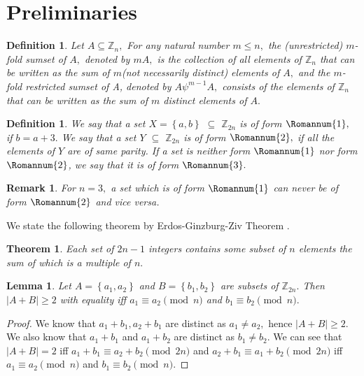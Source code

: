 \documentclass[reqno,10pt]{amsart}
\newtheorem{definition}[prop]{Definition}
\newtheorem{lem}[prop]{ Lemma}
\newtheorem{thm}[prop]{Theorem}
\newtheorem{remar}[prop]{Remark}
\newcommand{\one}{ \Romannum {1}}
\newcommand{\two}{\Romannum {2}}
\begin{document}
\section{Preliminaries}
\begin{definition} Let $ A \subseteq \mathbb{Z}_{n},$  
For any natural number $m \leq n,$ the (unrestricted) $m$-fold sumset of $A,$
denoted by $mA,$ is the collection of all elements of $ \mathbb{Z}_{n}$ that can be written as the sum of $m$(not necessarily distinct) elements of $A,$ and the $m$-fold restricted sumset of A, denoted by $A{\psi}^{m-1}A,$ consists of the elements of  $\mathbb{Z}_{n}$ that can be written as the sum of $m$ distinct elements of $A.$
% 
\end{definition}
\begin{definition} We say that a set $X= \left\lbrace a,b \right\rbrace $ $\subseteq$ $\mathbb{Z}_{2n}$  is of form $\Romannum{1},$ if $b=a+3.$ We say that a set $Y$ $\subseteq$  $\mathbb{Z}_{2n}$ is of form  $\Romannum{2},$ if all the elements of $Y$ are of same parity.  If a set is neither form $\Romannum{1}$ nor form $\Romannum{2}$, we say that it is of form $\Romannum{3}.$
\end{definition}
\begin{remar}
For $n=3,$ a set which is of form $\one$ can never be of form $\two$ and vice versa.
\end{remar}
We state the following theorem by Erdos-Ginzburg-Ziv Theorem  \cite{EGZ61}.
\begin{thm}\label{EGZ}
Each set of $2n-1$ integers contains some subset of $n$ elements the sum of which is a multiple of $n.$ 
\end{thm}
\begin{lem}
\label{gp}
Let $ A = \left\lbrace a_1, a_2 \right\rbrace $ and  $B = \left\lbrace b_1, b_2 \right\rbrace $  are subsets of $ \mathbb{Z}_{2n}.$ Then
$|A + B| \geq 2$ with equality iff $a_1 \equiv a_2 \pmod{n} $ and $b_1 \equiv b_2 \pmod{n}.$ 
\end{lem}
\begin{proof}
We know that $a_1+b_1,a_2+b_1$ are distinct as $a_1 \neq a_2,$ hence $|A + B| \geq 2.$ We also know that $a_1+b_1$ and $a_1+b_2$ are distinct as  $b_1 \neq b_2.$    We can see that $ |A+B|=2$ iff $ a_1+b_1 \equiv a_2+b_2 \pmod{2n}$ and $ a_2+b_1 \equiv a_1+b_2 \pmod {2n}$  iff  $a_1 \equiv a_2 \pmod{n}$ and $b_1 \equiv b_2 \pmod{n}.$
\end{proof}
\end{document}
